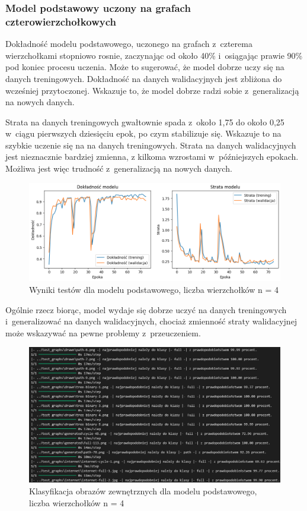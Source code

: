 \subsubsection{Model podstawowy uczony na grafach czterowierzchołkowych}

Dokładność modelu podstawowego, uczonego na grafach z~czterema wierzchołkami stopniowo rosnie,
zaczynając od około 40\% i~osiągając prawie 90\% pod koniec procesu uczenia.
Może to sugerować, że model dobrze uczy się na danych treningowych.
Dokładność na danych walidacyjnych jest zbliżona do wcześniej przytoczonej.
Wskazuje to, że model dobrze radzi sobie z~generalizacją na nowych danych.

Strata na danych treningowych gwałtownie spada z~około 1,75 do około 0,25 w~ciągu pierwszych dziesięciu epok,
po czym stabilizuje się.
Wskazuje to na szybkie uczenie się na na danych treningowych.
Strata na danych walidacyjnych jest nieznacznie bardziej zmienna,
z kilkoma wzrostami w~późniejszych epokach.
Możliwa jest więc trudność z~generalizacją na nowych danych.

\begin{figure}[ht]
	\centering
	\includegraphics[width=15.5cm]{resources/tests/images/v3/base4_img.png}
	\caption{Wyniki testów dla modelu podstawowego, liczba wierzchołków n = 4}
	\label{Fig:tests-base-1a}
\end{figure}
\FloatBarrier

Ogólnie rzecz biorąc, model wydaje się dobrze uczyć na danych treningowych i~generalizować na danych walidacyjnych,
chociaż zmienność straty walidacyjnej może wskazywać na pewne problemy z~przeuczeniem.

\begin{figure}[ht]
	\centering
	\includegraphics[width=15.5cm]{resources/tests/images/v3/base4_txt.png}
	\caption{Klasyfikacja obrazów zewnętrznych dla modelu podstawowego, liczba wierzchołków n = 4}
	\label{Fig:tests-base-1b}
\end{figure}
\FloatBarrier

